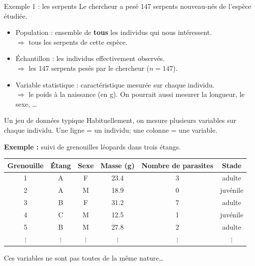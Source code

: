 \documentclass{BeamerTemplate}
\begin{document}
\begin{frame}[t]{Exemple 1 : les serpents}
  Le chercheur a pesé 147 serpents nouveau-nés de l'espèce étudiée.

  \begin{itemize}\itemsep 3mm
    \item<2-> \alert{Population} : ensemble de \textbf{tous} les individus qui
      nous intéressent.\\
      $\Rightarrow$ tous les serpents de cette espèce.
    \item<2-> \alert{Échantillon} : les individus effectivement observés.\\
      $\Rightarrow$ les 147 serpents pesés par le chercheur ($n = 147$).
    \item<2-> \alert{Variable statistique} : caractéristique mesurée sur chaque
      individu.\\
      $\Rightarrow$ le poids à la naissance (en g). On pourrait aussi mesurer
      la longueur, le sexe, \ldots
  \end{itemize}

  \medskip
\end{frame}

\begin{frame}[t]{Un jeu de données typique}
  Habituellement, on mesure \alert{plusieurs variables} sur chaque individu.
  Une ligne = un individu; une colonne = une variable.

  \medskip
  \textbf{Exemple :} suivi de grenouilles léopards dans trois étangs.

  \medskip
  \begin{center}\small
  \begin{tabular}{cccccc}
    \toprule
    Grenouille & Étang & Sexe & Masse (g) & Nombre de parasites & Stade \\
    \midrule
    1 & A & F & 23.4 & 3 & adulte \\
    2 & A & M & 18.9 & 0 & juvénile \\
    3 & B & F & 31.2 & 7 & adulte \\
    4 & C & M & 12.5 & 1 & juvénile \\
    5 & B & M & 27.8 & 2 & adulte \\
    $\vdots$ & $\vdots$ & $\vdots$ & $\vdots$ & $\vdots$ & $\vdots$ \\
    \bottomrule
  \end{tabular}
  \end{center}

  \medskip
  Ces variables ne sont pas toutes de la même nature\ldots
\end{frame}
\end{document}
